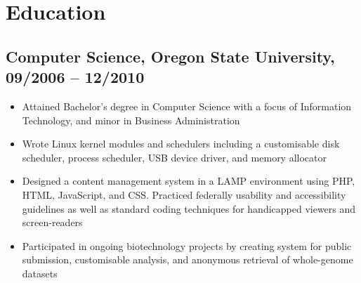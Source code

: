 \documentclass[a4paper,12pt]{report}
\begin{document}

\section*{Education}

\subsection*{Computer Science, Oregon State University, 09/2006 -- 12/2010}
\begin{itemize} \itemsep -0.25em
\item Attained Bachelor’s degree in Computer Science with a focus of Information Technology, and minor in Business Administration
\item Wrote Linux kernel modules and schedulers including a customisable disk scheduler, process scheduler, USB device driver, and memory allocator
\item Designed a content management system in a LAMP environment using PHP, HTML, JavaScript, and CSS. Practiced federally usability and accessibility guidelines as well as standard coding techniques for handicapped viewers and screen-readers
\item Participated in ongoing biotechnology projects by creating system for public submission, customisable analysis, and anonymous retrieval of whole-genome datasets

\end{itemize}
\end{document}
